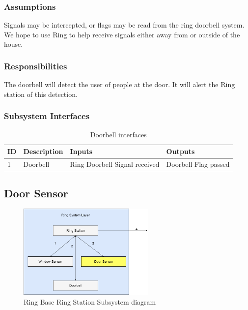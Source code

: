 \subsubsection{Assumptions}
Signals may be intercepted, or flags may be read from the ring doorbell system. We hope to use Ring to help receive signals either away from or outside of the house.

\subsubsection{Responsibilities}
The doorbell will detect the user of people at the door. It will alert the Ring station of this detection.

\subsubsection{Subsystem Interfaces}

\begin {table}[H]
\caption {Doorbell interfaces} 
\begin{center}
    \begin{tabular}{ | p{1cm} | p{6cm} | p{3cm} | p{3cm} |}
    \hline
    ID & Description & Inputs & Outputs \\ \hline
    1 & Doorbell & Ring Doorbell Signal received & Doorbell Flag passed  \\ \hline
    \end{tabular}
\end{center}
\end{table}

\subsection{Door Sensor}

\begin{figure}[h!]
	\centering
 	\includegraphics[width=0.60\textwidth]{images/RingLayer.drawio4.png}
 \caption{Ring Base Ring Station Subsystem diagram}
\end{figure}

